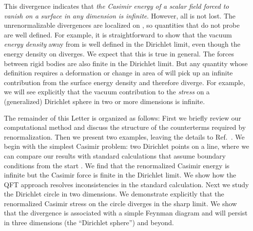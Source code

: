 \documentclass[a4paper,aps,amsfonts,prl,showpacs,nobibnotes,nofootinbib,%
tightenlines,twocolumn]{revtex4}
\begin{document}
This divergence indicates that \emph{the Casimir energy of a
scalar field forced to vanish on a surface in any dimension is
infinite}.  However, all is not lost.  The unrenormalizable
divergences are localized on \coordHE{}, so quantities that do not
probe \coordHE{} are well defined.  For example, it is straightforward
to show that the vacuum \emph{energy density} away from \coordHE{} is
well defined in the Dirichlet limit, even though the energy
density on \coordHE{} diverges\cite{GR}.  We expect that this is true
in general.  The forces between rigid bodies are also finite in the
Dirichlet limit.  But any quantity whose definition requires a
deformation or change in area of \coordHE{} will pick up an infinite
contribution from the surface energy density and therefore diverge. 
For example, we will see explicitly that the vacuum contribution to
the \emph{stress} on a (generalized) Dirichlet sphere in two or
more dimensions is infinite.


The remainder of this Letter is organized as follows: First we briefly
review our computational method and discuss the structure of the
counterterms required by renormalization.  Then we present two
examples, leaving the details to Ref.~\cite{dens}.  We begin with the
simplest Casimir problem: two Dirichlet points on a line, where we can
compare our results with standard calculations that assume
boundary conditions from the start \cite{MT}.   We find that the
renormalized Casimir energy is infinite but the Casimir force is
finite in the Dirichlet limit.  We show how the QFT approach resolves
inconsistencies in the standard calculation.  Next we study the
Dirichlet circle in two dimensions.  We demonstrate explicitly that
the renormalized Casimir stress on the circle diverges in the
sharp limit. We show that the
divergence is associated with a simple Feynman diagram and will
persist in three dimensions (the ``Dirichlet sphere'') and beyond.
\end{document}

